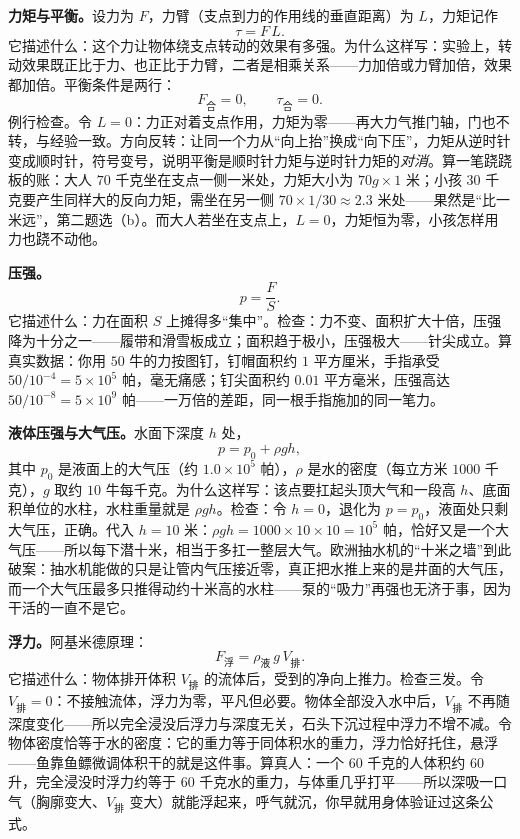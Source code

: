 \begin{mainline}
\textbf{力矩与平衡。}设力为 \(F\)，力臂（支点到力的作用线的垂直距离）为 \(L\)，力矩记作
\[
  \tau = F\,L .
\]
它描述什么：这个力让物体绕支点转动的效果有多强。为什么这样写：实验上，转动效果既正比于力、也正比于力臂，二者是相乘关系——力加倍或力臂加倍，效果都加倍。平衡条件是两行：
\[
  F_{\text{合}} = 0, \qquad \tau_{\text{合}} = 0 .
\]
例行检查。令 \(L=0\)：力正对着支点作用，力矩为零——再大力气推门轴，门也不转，与经验一致。方向反转：让同一个力从“向上抬”换成“向下压”，力矩从逆时针变成顺时针，符号变号，说明平衡是顺时针力矩与逆时针力矩的\emph{对消}。算一笔跷跷板的账：大人 \(70\) 千克坐在支点一侧一米处，力矩大小为 \(70g\times 1\) 米；小孩 \(30\) 千克要产生同样大的反向力矩，需坐在另一侧 \(70\times 1/30\approx 2.3\) 米处——果然是“比一米远”，第二题选（b）。而大人若坐在支点上，\(L=0\)，力矩恒为零，小孩怎样用力也跷不动他。

\textbf{压强。}
\[
  p = \frac{F}{S} .
\]
它描述什么：力在面积 \(S\) 上摊得多“集中”。检查：力不变、面积扩大十倍，压强降为十分之一——履带和滑雪板成立；面积趋于极小，压强极大——针尖成立。算真实数据：你用 \(50\) 牛的力按图钉，钉帽面积约 \(1\) 平方厘米，手指承受 \(50/10^{-4}=5\times10^{5}\) 帕，毫无痛感；钉尖面积约 \(0.01\) 平方毫米，压强高达 \(50/10^{-8}=5\times10^{9}\) 帕——一万倍的差距，同一根手指施加的同一笔力。

\textbf{液体压强与大气压。}水面下深度 \(h\) 处，
\[
  p = p_{0} + \rho g h,
\]
其中 \(p_{0}\) 是液面上的大气压（约 \(1.0\times10^{5}\) 帕），\(\rho\) 是水的密度（每立方米 \(1000\) 千克），\(g\) 取约 \(10\) 牛每千克。为什么这样写：该点要扛起头顶大气和一段高 \(h\)、底面积单位的水柱，水柱重量就是 \(\rho g h\)。检查：令 \(h=0\)，退化为 \(p=p_{0}\)，液面处只剩大气压，正确。代入 \(h=10\) 米：\(\rho g h=1000\times10\times10=10^{5}\) 帕，恰好又是一个大气压——所以每下潜十米，相当于多扛一整层大气。欧洲抽水机的“十米之墙”到此破案：抽水机能做的只是让管内气压接近零，真正把水推上来的是井面的大气压，而一个大气压最多只推得动约十米高的水柱——泵的“吸力”再强也无济于事，因为干活的一直不是它。

\textbf{浮力。}阿基米德原理：
\[
  F_{\text{浮}} = \rho_{\text{液}}\, g\, V_{\text{排}} .
\]
它描述什么：物体排开体积 \(V_{\text{排}}\) 的流体后，受到的净向上推力。检查三发。令 \(V_{\text{排}}=0\)：不接触流体，浮力为零，平凡但必要。物体全部没入水中后，\(V_{\text{排}}\) 不再随深度变化——所以完全浸没后浮力与深度无关，石头下沉过程中浮力不增不减。令物体密度恰等于水的密度：它的重力等于同体积水的重力，浮力恰好托住，悬浮——鱼靠鱼鳔微调体积干的就是这件事。算真人：一个 \(60\) 千克的人体积约 \(60\) 升，完全浸没时浮力约等于 \(60\) 千克水的重力，与体重几乎打平——所以深吸一口气（胸廓变大、\(V_{\text{排}}\) 变大）就能浮起来，呼气就沉，你早就用身体验证过这条公式。


\end{mainline}
